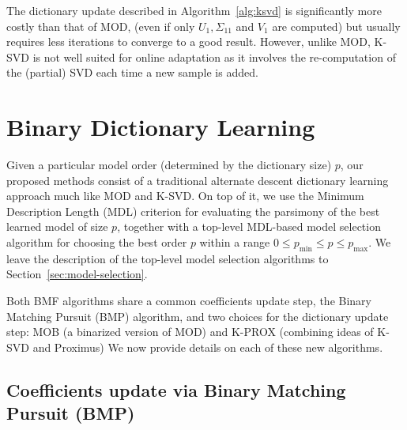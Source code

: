 \documentclass[twocolumn]{IEEEtran}
\theoremstyle{definition}
\begin{document}
The dictionary update described in Algorithm~\ref{alg:ksvd} is significantly more costly than that of MOD, (even if only $U_1,\Sigma_{11}$ and $V_1$ are computed) but usually requires less iterations to converge to a good result. However, unlike MOD, K-SVD is not well suited for online adaptation as it involves the re-computation of the (partial) SVD each time a new sample is added.


\section{Binary Dictionary Learning}
\label{sec:bdl}

Given a particular model order (determined by the dictionary size) $p$, our proposed methods consist of a traditional alternate descent dictionary learning approach much like MOD and K-SVD. On top of it, we use the Minimum Description Length (MDL) criterion for evaluating the parsimony of the best learned model of size $p$, together with a top-level MDL-based model selection algorithm for choosing the best order $p$ within a range $0 \leq  p_{\min} \leq p \leq  p_{\max}$. We leave the description of the top-level model selection algorithms to Section~\ref{sec:model-selection}.

Both BMF algorithms share a common coefficients update step, the Binary Matching Pursuit (BMP) algorithm, and  two choices for the dictionary update step: MOB (a binarized version of MOD) and K-PROX (combining ideas of K-SVD and Proximus)  We now provide details on each of these new algorithms.

\subsection{Coefficients update via Binary Matching Pursuit (BMP)}
\label{sec:bdl:bmp}
\end{document}
